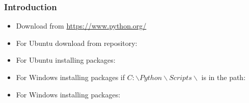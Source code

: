 
\begin{frame}
\frametitle{Introduction}

\begin{itemize}
\item Download from \url{https://www.python.org/}
\item For Ubuntu download from repository:

\item For Ubuntu installing packages:

\item For Windows installing packages if $C:\backslash Python\backslash Scripts \backslash$ is in the path:

\item For Windows installing packages:


\end{itemize}

\end{frame}
